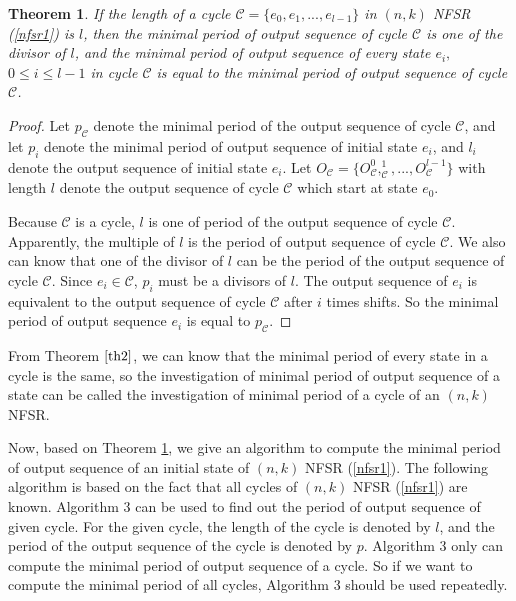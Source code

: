 \documentclass[conference]{IEEEtran}
\newtheorem{theorem}{Theorem}
\begin{document}
\begin{theorem}\label{th2}
If the length of a cycle $\mathcal{C}=\{e_0,e_1,...,e_{l-1}\}$ in $(n,k)$ NFSR (\ref{nfsr1}) is $l$, then the minimal period of output sequence of cycle $\mathcal{C}$ is one of the divisor of $l$, and the minimal period of output sequence of every state $e_i,$ $0\leq i\leq l-1$ in cycle $\mathcal{C}$ is equal to the minimal period of output sequence of cycle $\mathcal{C}$.
\end{theorem}
\begin{proof}
Let $p_{\mathcal{C}}$ denote the minimal period of the output sequence of cycle $\mathcal{C}$, and let $p_i$ denote the minimal period of output sequence of initial state $e_i$, and $l_i$ denote the output sequence of initial state $e_i$. Let $O_{\mathcal{C}}=\{O^0_{\mathcal{C}},^1_{\mathcal{C}},...,O^{l-1}_{\mathcal{C}}\}$ with length $l$ denote the output sequence of cycle $\mathcal{C}$ which start at state $e_0$.

Because $\mathcal{C}$ is a cycle, $l$ is one of period of the output sequence of cycle $\mathcal{C}$. Apparently, the multiple of $l$ is the period of output sequence of cycle $\mathcal{C}$. We also can know that one of the divisor of $l$ can be the period of the output sequence of cycle $\mathcal{C}$.
Since $e_i\in \mathcal{C}$, $p_i$ must be a divisors of $l$. The output sequence of $e_i$ is equivalent to the output sequence of cycle $\mathcal{C}$ after $i$ times shifts. So the minimal period of output sequence $e_i$ is equal to $p_{\mathcal{C}}$.
\end{proof}

From Theorem $\ref{th2}$, we can know that the minimal period of every state in a cycle is the same, so the investigation of minimal period of output sequence of a state can be called the investigation of minimal period of a cycle of an $(n,k)$ NFSR.

Now, based on Theorem \ref{th2}, we give an algorithm to compute the minimal period of output sequence of an initial state of $(n,k)$ NFSR (\ref{nfsr1}). The following algorithm is based on the fact that all cycles of $(n,k)$ NFSR (\ref{nfsr1}) are known. Algorithm 3 can be used to find out the period  of output sequence of given cycle. For the given cycle, the length of the cycle is denoted by $l$, and the period of the output sequence of the cycle is denoted by $p$. Algorithm 3 only can compute the minimal period of output sequence of a cycle. So if we want to compute the minimal period of all cycles, Algorithm 3 should be used repeatedly.
\end{document}
